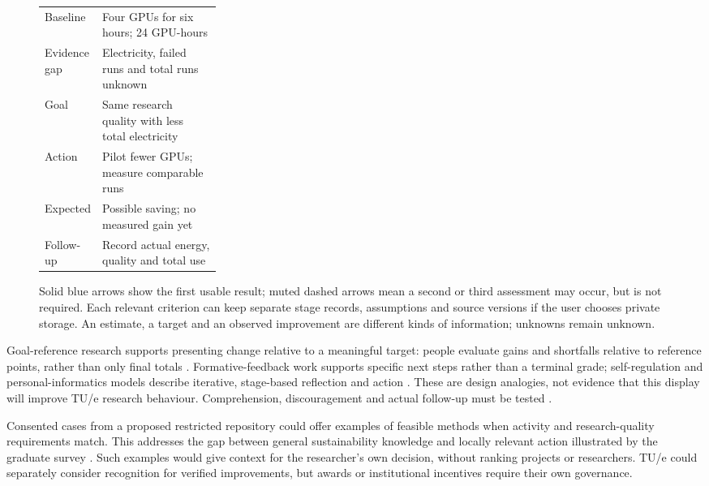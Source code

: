 \begin{figure}[!htbp]
\begin{minipage}[t]{0.53\textwidth}
\begin{tabularx}{\linewidth}{@{}>{\raggedright\arraybackslash}p{0.28\linewidth}>{\raggedright\arraybackslash}X@{}}
\midrule
Baseline & Four GPUs for six hours; 24 GPU-hours \\
Evidence gap & Electricity, failed runs and total runs unknown \\
Goal & Same research quality with less total electricity \\
Action & Pilot fewer GPUs; measure comparable runs \\
Expected & Possible saving; no measured gain yet \\
Follow-up & Record actual energy, quality and total use \\
\bottomrule
\end{tabularx}
\end{minipage}
\caption{Solid blue arrows show the first usable result; muted dashed arrows mean a second or third assessment may occur, but is not required. Each relevant criterion can keep separate stage records, assumptions and source versions if the user chooses private storage. An estimate, a target and an observed improvement are different kinds of information; unknowns remain unknown.}
\label{fig:start-shift-loop}
\end{figure}
Goal-reference research supports presenting change relative to a meaningful target: people evaluate gains and shortfalls relative to reference points, rather than only final totals \citep{kahneman1979prospect,heath1999goals}. Formative-feedback work supports specific next steps rather than a terminal grade; self-regulation and personal-informatics models describe iterative, stage-based reflection and action \citep{shute2008feedback,zimmerman2002self,li2010stages}. These are design analogies, not evidence that this display will improve TU/e research behaviour. Comprehension, discouragement and actual follow-up must be tested \citep{carver1982control,hattie2007feedback}.

Consented cases from a proposed restricted repository could offer examples of feasible methods when activity and research-quality requirements match. This addresses the gap between general sustainability knowledge and locally relevant action illustrated by the graduate survey \citep{shiekh2026graduate}. Such examples would give context for the researcher's own decision, without ranking projects or researchers. TU/e could separately consider recognition for verified improvements, but awards or institutional incentives require their own governance.


